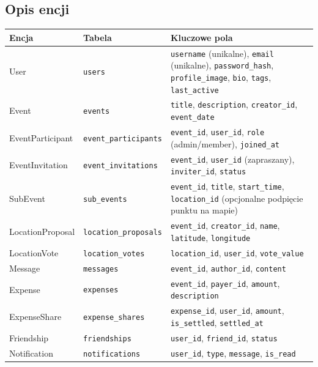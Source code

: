 \documentclass[11pt,a4paper]{article}
\begin{document}
\subsection{Opis encji}

\begin{longtable}{L{2.6cm} L{2.8cm} L{7.6cm}}
\toprule
\textbf{Encja} & \textbf{Tabela} & \textbf{Kluczowe pola} \\
\midrule
\endhead
User & \texttt{users} & \texttt{username} (unikalne), \texttt{email} (unikalne),
    \texttt{password\_hash}, \texttt{profile\_image}, \texttt{bio}, \texttt{tags},
    \texttt{last\_active} \\
Event & \texttt{events} & \texttt{title}, \texttt{description}, \texttt{creator\_id},
    \texttt{event\_date} \\
EventParticipant & \texttt{event\_participants} & \texttt{event\_id}, \texttt{user\_id},
    \texttt{role} (admin/member), \texttt{joined\_at} \\
EventInvitation & \texttt{event\_invitations} & \texttt{event\_id}, \texttt{user\_id}
    (zapraszany), \texttt{inviter\_id}, \texttt{status} \\
SubEvent & \texttt{sub\_events} & \texttt{event\_id}, \texttt{title}, \texttt{start\_time},
    \texttt{location\_id} (opcjonalne podpięcie punktu na mapie) \\
LocationProposal & \texttt{location\_proposals} & \texttt{event\_id}, \texttt{creator\_id},
    \texttt{name}, \texttt{latitude}, \texttt{longitude} \\
LocationVote & \texttt{location\_votes} & \texttt{location\_id}, \texttt{user\_id},
    \texttt{vote\_value} \\
Message & \texttt{messages} & \texttt{event\_id}, \texttt{author\_id}, \texttt{content} \\
Expense & \texttt{expenses} & \texttt{event\_id}, \texttt{payer\_id}, \texttt{amount},
    \texttt{description} \\
ExpenseShare & \texttt{expense\_shares} & \texttt{expense\_id}, \texttt{user\_id},
    \texttt{amount}, \texttt{is\_settled}, \texttt{settled\_at} \\
Friendship & \texttt{friendships} & \texttt{user\_id}, \texttt{friend\_id},
    \texttt{status} \\
Notification & \texttt{notifications} & \texttt{user\_id}, \texttt{type}, \texttt{message},
    \texttt{is\_read} \\
\bottomrule
\end{longtable}
\end{document}
